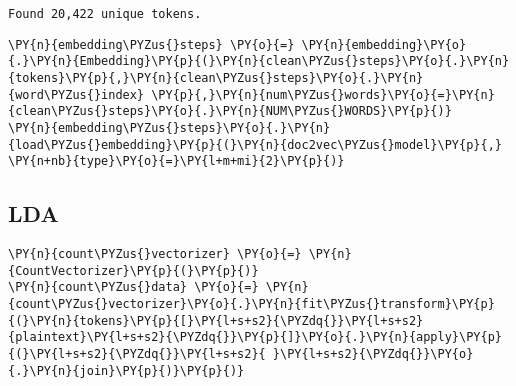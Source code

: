     \begin{Verbatim}[commandchars=\\\{\}]
Found 20,422 unique tokens.
    \end{Verbatim}

    \begin{tcolorbox}[breakable, size=fbox, boxrule=1pt, pad at break*=1mm,colback=cellbackground, colframe=cellborder]
\begin{Verbatim}[commandchars=\\\{\}]
\PY{n}{embedding\PYZus{}steps} \PY{o}{=} \PY{n}{embedding}\PY{o}{.}\PY{n}{Embedding}\PY{p}{(}\PY{n}{clean\PYZus{}steps}\PY{o}{.}\PY{n}{tokens}\PY{p}{,}\PY{n}{clean\PYZus{}steps}\PY{o}{.}\PY{n}{word\PYZus{}index} \PY{p}{,}\PY{n}{num\PYZus{}words}\PY{o}{=}\PY{n}{clean\PYZus{}steps}\PY{o}{.}\PY{n}{NUM\PYZus{}WORDS}\PY{p}{)}
\PY{n}{embedding\PYZus{}steps}\PY{o}{.}\PY{n}{load\PYZus{}embedding}\PY{p}{(}\PY{n}{doc2vec\PYZus{}model}\PY{p}{,} \PY{n+nb}{type}\PY{o}{=}\PY{l+m+mi}{2}\PY{p}{)}
\end{Verbatim}
\end{tcolorbox}

    \hypertarget{lda}{%
\subsection{LDA}\label{lda}}

    \begin{tcolorbox}[breakable, size=fbox, boxrule=1pt, pad at break*=1mm,colback=cellbackground, colframe=cellborder]
\begin{Verbatim}[commandchars=\\\{\}]
\PY{n}{count\PYZus{}vectorizer} \PY{o}{=} \PY{n}{CountVectorizer}\PY{p}{(}\PY{p}{)}
\PY{n}{count\PYZus{}data} \PY{o}{=} \PY{n}{count\PYZus{}vectorizer}\PY{o}{.}\PY{n}{fit\PYZus{}transform}\PY{p}{(}\PY{n}{tokens}\PY{p}{[}\PY{l+s+s2}{\PYZdq{}}\PY{l+s+s2}{plaintext}\PY{l+s+s2}{\PYZdq{}}\PY{p}{]}\PY{o}{.}\PY{n}{apply}\PY{p}{(}\PY{l+s+s2}{\PYZdq{}}\PY{l+s+s2}{ }\PY{l+s+s2}{\PYZdq{}}\PY{o}{.}\PY{n}{join}\PY{p}{)}\PY{p}{)}      
\end{Verbatim}
\end{tcolorbox}

